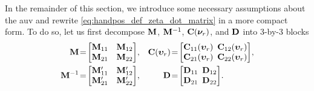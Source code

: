 \vspace*{-0.5em}

\noindent In the remainder of this section, we introduce some necessary assumptions about the \gls{auv} and rewrite \eqref{eq:handpos_def_zeta_dot_matrix} in a more compact form.
To do so, let us first decompose $\mathbf{M}$, $\mathbf{M}^{-1}$, $\mathbf{C}(\bm{\nu}_r)$, and $\mathbf{D}$ into 3-by-3 blocks \vspace*{-0.2em}
\begin{subequations}
\begin{align}
    \mat{M}\! &=\! \begin{bmatrix}
        \mat{M}_{11} & \mat{M}_{12} \\ \mat{M}_{21} & \mat{M}_{22}
    \end{bmatrix}\!, &
    \mat{C}(\bvel_r)\! &=\! \begin{bmatrix}
        \mat{C}_{11}(\bvel_r)\!\!\! & \mat{C}_{12}(\bvel_r) \\ \mat{C}_{21}(\bvel_r)\!\!\! & \mat{C}_{22}(\bvel_r)
    \end{bmatrix}\!, \\
    \mat{M}^{-1}\! &=\! \begin{bmatrix}
        \mat{M}_{11}^{\prime} & \mat{M}_{12}^{\prime} \\ \mat{M}_{21}^{\prime} & \mat{M}_{22}^{\prime}
    \end{bmatrix}\!, &
    \mat{D}\! &=\! \begin{bmatrix}
        \mat{D}_{11}\!\!\! & \mat{D}_{12} \\ \mat{D}_{21}\!\!\! & \mat{D}_{22}
    \end{bmatrix}\!.
\end{align}
\end{subequations}

